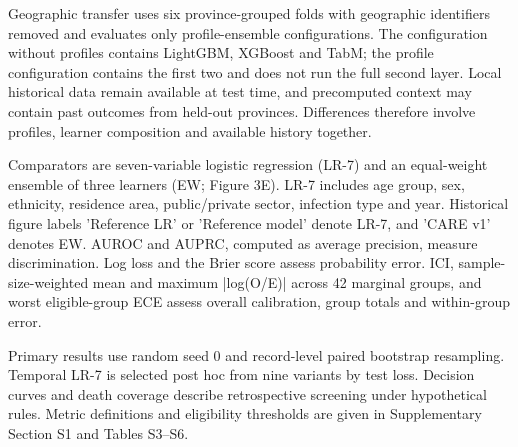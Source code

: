 \documentclass[11pt,a4paper]{article}
\begin{document}
Geographic transfer uses six province-grouped folds with geographic identifiers removed and evaluates only profile-ensemble configurations. The configuration without profiles contains LightGBM, XGBoost and TabM; the profile configuration contains the first two and does not run the full second layer. Local historical data remain available at test time, and precomputed context may contain past outcomes from held-out provinces. Differences therefore involve profiles, learner composition and available history together.

Comparators are seven-variable logistic regression (LR-7) and an equal-weight ensemble of three learners (EW; Figure 3E). LR-7 includes age group, sex, ethnicity, residence area, public/private sector, infection type and year. Historical figure labels 'Reference LR' or 'Reference model' denote LR-7, and 'CARE v1' denotes EW. AUROC and AUPRC, computed as average precision, measure discrimination. Log loss and the Brier score assess probability error. ICI, sample-size-weighted mean and maximum |log(O/E)| across 42 marginal groups, and worst eligible-group ECE assess overall calibration, group totals and within-group error.

Primary results use random seed 0 and record-level paired bootstrap resampling. Temporal LR-7 is selected post hoc from nine variants by test loss. Decision curves and death coverage describe retrospective screening under hypothetical rules. Metric definitions and eligibility thresholds are given in Supplementary Section S1 and Tables S3–S6.

\clearpage
\end{document}
